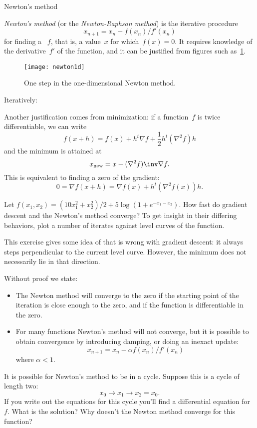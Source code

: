  {Newton's method}
\label{sec:newton}

\emph{Newton's method}
%
(or the
\emph{Newton-Raphson method})
%
is the iterative procedure
\[ x_{n+1} = x_n-f(x_n)/f'(x_n) \]
for finding a ~$f$,
that is, a value~$x$ for which~$f(x)=0$.
It requires knowledge of the derivative~$f'$
of the function, and it can be justified from figures such
as~\ref{fig:newton1d}.

\begin{figure}[ht]
  \texttt{[image: newton1d]}
  \caption{One step in the one-dimensional Newton method.}
  \label{fig:newton1d}
\end{figure}

Iteratively:

Another justification comes from minimization: if a function~$f$ is
twice differentiable, we can write
\[ f(x+h) = f(x) + h^t\nabla f + \frac12 h^t(\nabla^2f) h \]
and the minimum is attained at
\[ x_{\scriptstyle\mathrm{new}} = x - (\nabla^2f)\inv \nabla f. \]
This is equivalent to finding a zero of the gradient:
\[ 0=\nabla f(x+h) = \nabla f(x)+h^t(\nabla^2f(x))h. \]

\begin{exercise}
  Let $f(x_1,x_2) = (10x_1^2+x_2^2)/2 + 5\log(1+e^{-x_1-x_2})$.
  How fast do gradient descent and the Newton's method converge?
  To get insight in their differing behaviors, plot a number of
  iterates against level curves of the function.
\end{exercise}

This exercise gives some idea of that is wrong with gradient descent:
it always steps perpendicular to the current level curve. However, the
minimum does not necessarily lie in that direction.

Without proof we state:
\begin{itemize}
\item The Newton method will converge to the zero if the starting
  point of the iteration is close enough to the zero, and if the
  function is differentiable in the zero.
\item For many functions Newton's method will not converge, but it is
  possible to obtain convergence by introducing damping,
  or doing an inexact update:
  \[ x_{n+1} = x_n-\alpha f(x_n)/f'(x_n) \]
  where $\alpha<1$.
\end{itemize}

\begin{exercise}
  It is possible for Newton's method to be in a cycle. Suppose this is
  a cycle of length two: \[ x_0\rightarrow x_1 \rightarrow x_2=x_0. \]
  If you write out the equations for this cycle you'll find a
  differential equation for~$f$. What is the solution? Why doesn't the
  Newton method converge for this function?
\end{exercise}

